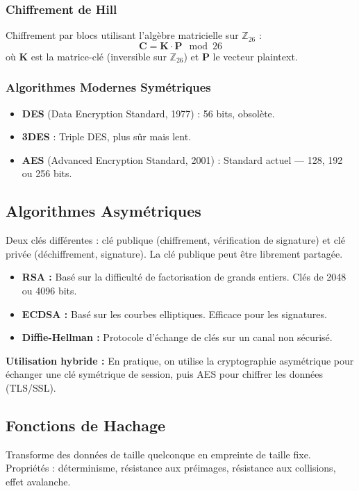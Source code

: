 \subsubsection{Chiffrement de Hill}
Chiffrement par blocs utilisant l'algèbre matricielle sur $\mathbb{Z}_{26}$ :
\[
\mathbf{C} = \mathbf{K} \cdot \mathbf{P} \mod 26
\]
où $\mathbf{K}$ est la matrice-clé (inversible sur $\mathbb{Z}_{26}$) et $\mathbf{P}$ le vecteur plaintext.

\subsubsection{Algorithmes Modernes Symétriques}
\begin{itemize}
    \item \textbf{DES} (Data Encryption Standard, 1977) : 56 bits, obsolète.
    \item \textbf{3DES} : Triple DES, plus sûr mais lent.
    \item \textbf{AES} (Advanced Encryption Standard, 2001) : Standard actuel — 128, 192 ou 256 bits.
\end{itemize}

\subsection{Algorithmes Asymétriques}
Deux clés différentes : clé publique (chiffrement, vérification de signature) et clé privée (déchiffrement, signature). La clé publique peut être librement partagée.

\begin{itemize}
    \item \textbf{RSA :} Basé sur la difficulté de factorisation de grands entiers. Clés de 2048 ou 4096 bits.
    \item \textbf{ECDSA :} Basé sur les courbes elliptiques. Efficace pour les signatures.
    \item \textbf{Diffie-Hellman :} Protocole d'échange de clés sur un canal non sécurisé.
\end{itemize}

\begin{boxinfo}
\textbf{Utilisation hybride :} En pratique, on utilise la cryptographie asymétrique pour échanger une clé symétrique de session, puis AES pour chiffrer les données (TLS/SSL).
\end{boxinfo}

\subsection{Fonctions de Hachage}
Transforme des données de taille quelconque en empreinte de taille fixe. Propriétés : déterminisme, résistance aux préimages, résistance aux collisions, effet avalanche.

